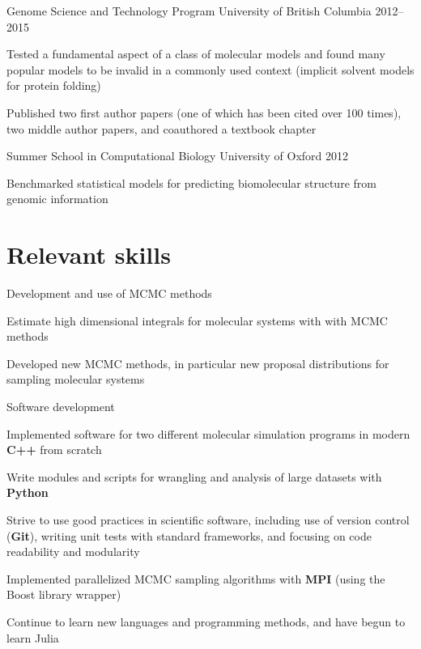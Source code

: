 \documentclass[10pt]{article}
\begin{document}
\research
    {Genome Science and Technology Program}
    {University of British Columbia}
    {2012--2015}
    {
        \item Tested a fundamental aspect of a class of molecular models and found many popular models to be invalid in a commonly used context (implicit solvent models for protein folding)
        \item Published two first author papers (one of which has been cited over 100 times), two middle author papers, and coauthored a textbook chapter
    }
    \vspace{0.3cm}

\research
    {Summer School in Computational Biology}
    {University of Oxford}
    {2012}
    {
        \item Benchmarked statistical models for predicting biomolecular structure from genomic information
    }

\section{Relevant skills}
\vspace{-0.2cm}

\skill
    {Development and use of MCMC methods}
    {
        \item Estimate high dimensional integrals for molecular systems with with MCMC methods
        \item Developed new MCMC methods, in particular new proposal distributions for sampling molecular systems
    }
    \vspace{0.3cm}

\skill
    {Software development}
    {
        \item Implemented software for two different molecular simulation programs in modern \textbf{C++} from scratch
        \item Write modules and scripts for wrangling and analysis of large datasets with \textbf{Python}
        \item Strive to use good practices in scientific software, including use of version control (\textbf{Git}), writing unit tests with standard frameworks, and focusing on code readability and modularity
        \item Implemented parallelized MCMC sampling algorithms with \textbf{MPI} (using the Boost library wrapper)
        \item Continue to learn new languages and programming methods, and have begun to learn Julia
    }
    \vspace{0.3cm}
\end{document}
